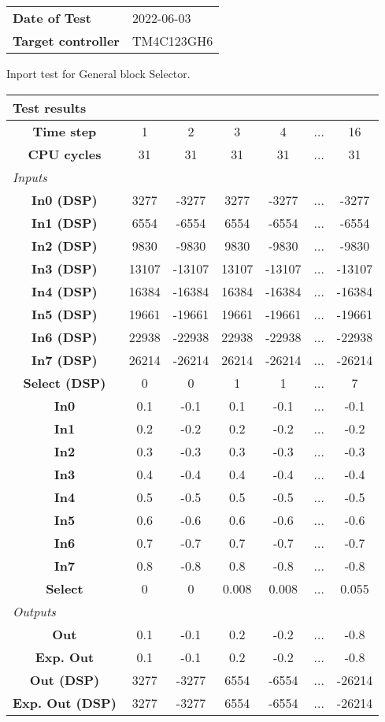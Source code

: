 \begin{tabular}{l l}
\textbf{Date of Test} & 2022-06-03 \tabularnewline
\textbf{Target controller} & TM4C123GH6 \tabularnewline
\end{tabular}
\vspace{1ex}
Inport test for General block Selector.

\vspace{1em}
\begin{tabularx}{\textwidth}{|c|c|c|c|c|>{\centering\arraybackslash}X|c|}
\hline
\multicolumn{7}{|l|}{\cellcolor[gray]{0.8}\textbf{Test results}} \tabularnewline \hline
\textbf{Time step} & 1 & 2 & 3 & 4 & ... & 16 \tabularnewline \hline
\textbf{CPU cycles} & 31 & 31 & 31 & 31 & ... & 31 \tabularnewline \hline
\multicolumn{7}{|l|}{\cellcolor[gray]{0.9}\textit{Inputs}} \tabularnewline \hline
\textbf{In0 (DSP)} & 3277 & -3277 & 3277 & -3277 & ... & -3277 \tabularnewline \hline
\textbf{In1 (DSP)} & 6554 & -6554 & 6554 & -6554 & ... & -6554 \tabularnewline \hline
\textbf{In2 (DSP)} & 9830 & -9830 & 9830 & -9830 & ... & -9830 \tabularnewline \hline
\textbf{In3 (DSP)} & 13107 & -13107 & 13107 & -13107 & ... & -13107 \tabularnewline \hline
\textbf{In4 (DSP)} & 16384 & -16384 & 16384 & -16384 & ... & -16384 \tabularnewline \hline
\textbf{In5 (DSP)} & 19661 & -19661 & 19661 & -19661 & ... & -19661 \tabularnewline \hline
\textbf{In6 (DSP)} & 22938 & -22938 & 22938 & -22938 & ... & -22938 \tabularnewline \hline
\textbf{In7 (DSP)} & 26214 & -26214 & 26214 & -26214 & ... & -26214 \tabularnewline \hline
\textbf{Select (DSP)} & 0 & 0 & 1 & 1 & ... & 7 \tabularnewline \hline
\textbf{In0} & 0.1 & -0.1 & 0.1 & -0.1 & ... & -0.1 \tabularnewline \hline
\textbf{In1} & 0.2 & -0.2 & 0.2 & -0.2 & ... & -0.2 \tabularnewline \hline
\textbf{In2} & 0.3 & -0.3 & 0.3 & -0.3 & ... & -0.3 \tabularnewline \hline
\textbf{In3} & 0.4 & -0.4 & 0.4 & -0.4 & ... & -0.4 \tabularnewline \hline
\textbf{In4} & 0.5 & -0.5 & 0.5 & -0.5 & ... & -0.5 \tabularnewline \hline
\textbf{In5} & 0.6 & -0.6 & 0.6 & -0.6 & ... & -0.6 \tabularnewline \hline
\textbf{In6} & 0.7 & -0.7 & 0.7 & -0.7 & ... & -0.7 \tabularnewline \hline
\textbf{In7} & 0.8 & -0.8 & 0.8 & -0.8 & ... & -0.8 \tabularnewline \hline
\textbf{Select} & 0 & 0 & 0.008 & 0.008 & ... & 0.055 \tabularnewline \hline
\multicolumn{7}{|l|}{\cellcolor[gray]{0.9}\textit{Outputs}} \tabularnewline \hline
\textbf{Out} & 0.1 & -0.1 & 0.2 & -0.2 & ... & -0.8 \tabularnewline \hline
\textbf{Exp. Out} & 0.1 & -0.1 & 0.2 & -0.2 & ... & -0.8 \tabularnewline \hline
\textbf{Out (DSP)} & 3277 & -3277 & 6554 & -6554 & ... & -26214 \tabularnewline \hline
\textbf{Exp. Out (DSP)} & 3277 & -3277 & 6554 & -6554 & ... & -26214 \tabularnewline \hline
\end{tabularx}
\vspace{1ex}

